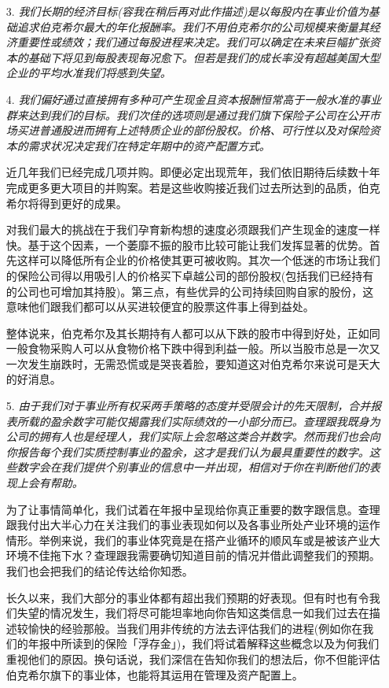 \documentclass[UTF8,a4paper,zihao=-4,fontset = windows]{ctexart} %
\begin{document}
\begin{itemize}
    \item [3.]
    \textit{我们长期的经济目标(容我在稍后再对此作描述)是以每股内在事业价值为基础追求伯克希尔最大的年化报酬率。我们不用伯克希尔的公司规模来衡量其经济重要性或绩效；我们通过每股进程来决定。我们可以确定在未来巨幅扩张资本的基础下将见到每股表现每况愈下。但若是我们的成长率没有超越美国大型企业的平均水准我们将感到失望。}

    \item [4.]
    \textit{我们偏好通过直接拥有多种可产生现金且资本报酬恒常高于一般水准的事业群来达到我们的目标。我们次佳的选项则是通过我们旗下保险子公司在公开市场买进普通股进而拥有上述特质企业的部份股权。价格、可行性以及对保险资本的需求状况决定我们在特定年期中的资产配置方式。}

    近几年我们已经完成几项并购。即便必定出现荒年，我们依旧期待后续数十年完成更多更大项目的并购案。若是这些收购接近我们过去所达到的品质，伯克希尔将得到更好的成果。
    
    对我们最大的挑战在于我们孕育新构想的速度必须跟我们产生现金的速度一样快。基于这个因素，一个萎靡不振的股市比较可能让我们发挥显著的优势。首先这样可以降低所有企业的价格使其更可被收购。其次一个低迷的市场让我们的保险公司得以用吸引人的价格买下卓越公司的部份股权(包括我们已经持有的公司也可增加其持股)。第三点，有些优异的公司持续回购自家的股份，这意味他们跟我们都可以从买进较便宜的股票这件事上得到益处。
    
    整体说来，伯克希尔及其长期持有人都可以从下跌的股市中得到好处，正如同一般食物采购人可以从食物价格下跌中得到利益一般。所以当股市总是一次又一次发生崩跌时，无需恐慌或是哭丧着脸，要知道这对伯克希尔来说可是天大的好消息。

    \item [5.]
    \textit{由于我们对于事业所有权采两手策略的态度并受限会计的先天限制，合并报表所载的盈余数字可能仅揭露我们实际绩效的一小部分而已。查理跟我既身为公司的拥有人也是经理人，我们实际上会忽略这类合并数字。然而我们也会向你报告每个我们实质控制事业的盈余，这才是我们认为最具重要性的数字。这些数字会在我们提供个别事业的信息中一并出现，相信对于你在判断他们的表现上会有帮助。}

    为了让事情简单化，我们试着在年报中呈现给你真正重要的数字跟信息。查理跟我付出大半心力在关注我们的事业表现如何以及各事业所处产业环境的运作情形。举例来说，我们的事业体究竟是在搭产业循环的顺风车或是被该产业大环境不佳拖下水？查理跟我需要确切知道目前的情况并借此调整我们的预期。我们也会把我们的结论传达给你知悉。
    
    长久以来，我们大部分的事业体都有超出我们预期的好表现。但有时也有令我们失望的情况发生，我们将尽可能坦率地向你告知这类信息一如我们过去在描述较愉快的经验那般。当我们用非传统的方法去评估我们的进程(例如你在我们的年报中所读到的保险「浮存金」)，我们将试着解释这些概念以及为何我们重视他们的原因。换句话说，我们深信在告知你我们的想法后，你不但能评估伯克希尔旗下的事业体，也能将其运用在管理及资产配置上。 


\end{itemize}
\end{document}
